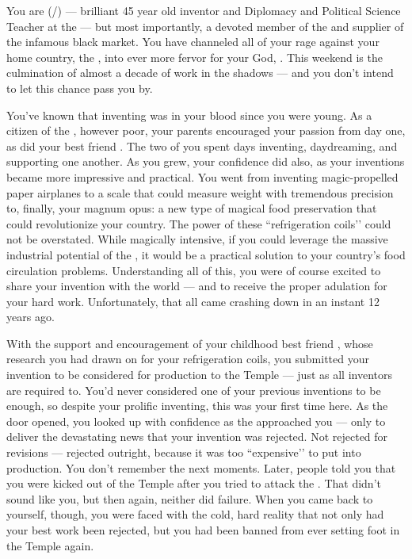 \documentclass[char]{GL2020}
\begin{document}
\name{\cChupInventor{}}

You are \cChupInventor{\full} (\cChupInventor{\they}/\cChupInventor{\them}) — brilliant 45 year old inventor and Diplomacy and Political Science Teacher at the \pSchool{} — but most importantly, a devoted member of the \pGoaties{} and supplier of the infamous black market. You have channeled all of your rage against your home country, the \pTech{}, into ever more fervor for your God, \cGenesis{}. This weekend is the culmination of almost a decade of work in the shadows — and you don't intend to let this chance pass you by.

You've known that inventing was in your blood since you were young. As a citizen of the \pTech{}, however poor, your parents encouraged your passion from day one, as did your best friend \cHeadScientist{\full}. The two of you spent days inventing, daydreaming, and supporting one another. As you grew, your confidence did also, as your inventions became more impressive and practical. You went from inventing magic-propelled paper airplanes to a scale that could measure weight with tremendous precision to, finally, your magnum opus: a new type of magical food preservation that could revolutionize your country. The power of these ``refrigeration coils'’ could not be overstated. While magically intensive, if you could leverage the massive industrial potential of the \pTech{}, it would be a practical solution to your country's food circulation problems. Understanding all of this, you were of course excited to share your invention with the world — and to receive the proper adulation for your hard work. Unfortunately, that all came crashing down in an instant 12 years ago.

With the support and encouragement of your childhood best friend \cHeadScientist{}, whose research you had drawn on for your refrigeration coils, you submitted your invention to be considered for production to the Temple — just as all inventors are required to. You'd never considered one of your previous inventions to be enough, so despite your prolific inventing, this was your first time here. As the door opened, you looked up with confidence as the \cAntiChup{\cleric} approached you — only to deliver the devastating news that your invention was rejected. Not rejected for revisions — rejected outright, because it was too ``expensive'’ to put into production. You don't remember the next moments. Later, people told you that you were kicked out of the Temple after you tried to attack the \cAntiChup{\cleric}. That didn't sound like you, but then again, neither did failure. When you came back to yourself, though, you were faced with the cold, hard reality that not only had your best work been rejected, but you had been banned from ever setting foot in the Temple again.
\end{document}
